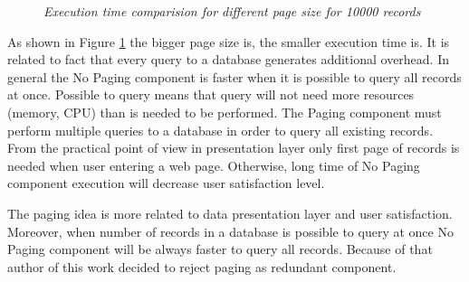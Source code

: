 \documentclass[10pt,a4paper]{article}
\begin{document}
\begin{figure}[!htb]
\centering
{}
\caption{\textit{Execution time comparision for different page size for 10000 records}} \label{fig:pagesizetime}
\end{figure}

As shown in Figure \ref{fig:pagesizetime} the bigger page size is, the smaller execution time is. It is related to fact that every query to a database generates additional overhead. 
In general the No Paging component is faster when it is possible to query all records at once. Possible to query means that query will not need more resources (memory, CPU) than is needed to be performed. 
The Paging component must perform multiple queries to a database in order to query all existing records. From the practical point of view in presentation layer only first page of records is needed when user entering a web page. Otherwise, long time of No Paging component execution will decrease user satisfaction level.  

The paging idea is more related to data presentation layer and user satisfaction. Moreover, when number of records in a database is possible to query at once No Paging component will be always faster to query all records. Because of that author of this work decided to reject paging as redundant component. 
\end{document}
